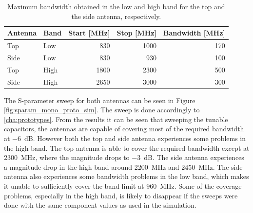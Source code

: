     \begin{table}
      \centering
      \begin{tabular}{|l|l|r|r|r|}
        \hline
        Antenna & Band & Start [MHz] & Stop [MHz] & Bandwidth [MHz] \\
        \hline
        Top     & Low  & 830        & 1000       & 170 \\
        Side    & Low  & 830         & 930        & 100 \\
        \hline
        Top     & High & 1800        & 2300       & 500 \\
        Side    & High & 2650        & 3000       & 300 \\
        \hline
      \end{tabular}
      \caption{Maximum bandwidth obtained in the low and high band for the top and the side antenna, respectively.}
      \label{tab:bw_sol1_proto}
    \end{table}

The S-parameter sweep for both antennas can be seen in Figure \ref{fig:sparam_mono_proto_sim}. The sweep is done accordingly to \ref{cha:prototypes}. From the results it can be seen that sweeping the tunable capacitors, the antennas are capable of covering most of the required bandwidth at \SI{-6}{dB}. However both the top and side antenna experiences some problems in the high band. The top antenna is able to cover the required bandwidth except at \SI{2300}{MHz}, where the magnitude drops to \SI{-3}{dB}. The side antenna experiences a magnitude drop in the high band around \SI{2200}{MHz} and \SI{2450}{MHz}. The side antenna also experiences some bandwidth problems in the low band, which makes it unable to sufficiently cover the band limit at \SI{960}{MHz}. Some of the coverage problems, especially in the high band, is likely to disappear if the sweeps were done with the same component values as used in the simulation.   

